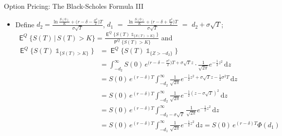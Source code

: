\documentclass[10pt,handout]{beamer}
\DeclareMathOperator\indc{\mathds{1}}
\newcommand{\ds}{\displaystyle}
\DeclareMathOperator\prb{\mathsf{P}}
\DeclareMathOperator\expc{\mathsf{E}}
\theoremstyle{definition}
\begin{document}
\begin{frame}{Option Pricing: The Black-Scholes Formula III}
  \begin{itemize} 
    \item Define $\ds d_2 = \frac{\ln\frac{S(0)}{K} + \big(r - \delta - \frac{\sigma^2}{2}\big)T}{\sigma\sqrt{T}}$, $\ds d_1$ $=$ $\ds\frac{\ln\frac{S(0)}{K} + \big(r - \delta + \frac{\sigma^2}{2}\big)T}{\sigma\sqrt{T}}$ $=$ $d_2 + \sigma\sqrt{T}$; $\;\ds\expc^Q\{S(T)\,|\, S(T) > K\} = \frac{\expc^Q\big\{S(T)\indc_{\{S(T) > K\}}\big\}}{\prb^Q\{S(T) > K\}}$ and \vspace{-2mm}
      \begin{align*}
        \expc^Q\big\{S(T)\indc_{\{S(T) > K\}}\big\} &= \expc^Q\big\{S(T)\indc_{\{Z > -d_2\}}\big\} \\
        &= \int_{-d_2}^\infty S(0)\,e^{\big(r - \delta - \frac{\sigma^2}{2}\big)T + \sigma\sqrt{T}z}\cdot\frac{1}{\sqrt{2\pi}}e^{-\frac{1}{2}z^2}\,\mathrm{d}z \\
        &= S(0)\,e^{(r - \delta)T}\int_{-d_2}^\infty \frac{1}{\sqrt{2\pi}}e^{-\frac{1}{2}z^2 + \sigma\sqrt{T}z - \frac{1}{2}\sigma^2 T}\,\mathrm{d}z \\
        &= S(0)\,e^{(r - \delta)T}\int_{-d_2}^\infty \frac{1}{\sqrt{2\pi}}e^{-\frac{1}{2}(z - \sigma\sqrt{T})^2}\,\mathrm{d}z \\
        &= S(0)\,e^{(r - \delta)T}\int_{-d_2-\sigma\sqrt{T}}^\infty \frac{1}{\sqrt{2\pi}}e^{-\frac{1}{2}z^2}\,\mathrm{d}z \\
        &= S(0)\,e^{(r - \delta)T}\int_{-d_1}^\infty \frac{1}{\sqrt{2\pi}}e^{-\frac{1}{2}z^2}\,\mathrm{d}z = S(0)\,e^{(r - \delta)T}\Phi(d_1)
      \end{align*} 
  \end{itemize}
\end{frame}
\end{document}
